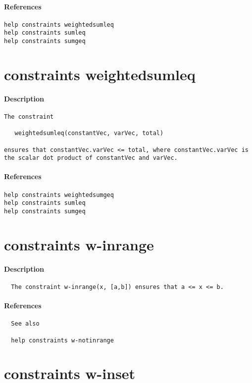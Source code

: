 \paragraph{References}
{\footnotesize
\begin{verbatim}
help constraints weightedsumleq
help constraints sumleq
help constraints sumgeq
\end{verbatim}
}
\section{constraints weightedsumleq}
\paragraph{Description}
{\footnotesize
\begin{verbatim}
The constraint

   weightedsumleq(constantVec, varVec, total)

ensures that constantVec.varVec <= total, where constantVec.varVec is
the scalar dot product of constantVec and varVec.
\end{verbatim}
}
\paragraph{References}
{\footnotesize
\begin{verbatim}
help constraints weightedsumgeq
help constraints sumleq
help constraints sumgeq
\end{verbatim}
}
\section{constraints w-inrange}
\paragraph{Description}
{\footnotesize
\begin{verbatim}
  The constraint w-inrange(x, [a,b]) ensures that a <= x <= b.
\end{verbatim}
}
\paragraph{References}
{\footnotesize
\begin{verbatim}
  See also

  help constraints w-notinrange
\end{verbatim}
}
\section{constraints w-inset}
